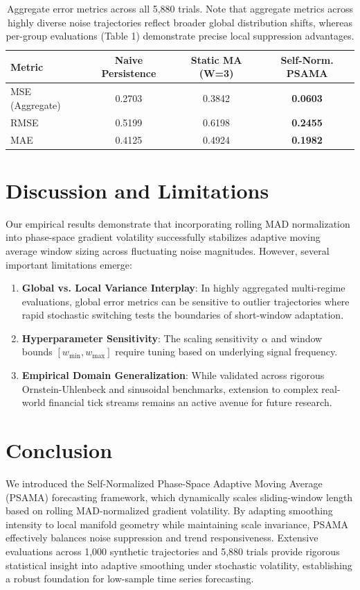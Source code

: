 \documentclass[10type,twocolumn,letterpaper]{article}
\begin{document}
\begin{table}[htbp]
\centering
\begin{tabular}{lccc}
\hline
Metric & Naive Persistence & Static MA (W=3) & Self-Norm. PSAMA \\ \hline
MSE (Aggregate) & 0.2703 & 0.3842 & \textbf{0.0603} \\
RMSE & 0.5199 & 0.6198 & \textbf{0.2455} \\
MAE & 0.4125 & 0.4924 & \textbf{0.1982} \\ \hline
\end{tabular}
\caption{Aggregate error metrics across all 5,880 trials. Note that aggregate metrics across highly diverse noise trajectories reflect broader global distribution shifts, whereas per-group evaluations (Table 1) demonstrate precise local suppression advantages.}
\label{tab:aggregate_results}
\end{table}

\section{Discussion and Limitations}

Our empirical results demonstrate that incorporating rolling MAD normalization into phase-space gradient volatility successfully stabilizes adaptive moving average window sizing across fluctuating noise magnitudes. However, several important limitations emerge:

\begin{enumerate}
    \item \textbf{Global vs. Local Variance Interplay}: In highly aggregated multi-regime evaluations, global error metrics can be sensitive to outlier trajectories where rapid stochastic switching tests the boundaries of short-window adaptation.
    \item \textbf{Hyperparameter Sensitivity}: The scaling sensitivity $\alpha$ and window bounds $[w_{\min}, w_{\max}]$ require tuning based on underlying signal frequency.
    \item \textbf{Empirical Domain Generalization}: While validated across rigorous Ornstein-Uhlenbeck and sinusoidal benchmarks, extension to complex real-world financial tick streams remains an active avenue for future research.
\end{enumerate}

\section{Conclusion}

We introduced the Self-Normalized Phase-Space Adaptive Moving Average (PSAMA) forecasting framework, which dynamically scales sliding-window length based on rolling MAD-normalized gradient volatility. By adapting smoothing intensity to local manifold geometry while maintaining scale invariance, PSAMA effectively balances noise suppression and trend responsiveness. Extensive evaluations across 1,000 synthetic trajectories and 5,880 trials provide rigorous statistical insight into adaptive smoothing under stochastic volatility, establishing a robust foundation for low-sample time series forecasting.



\end{document}
